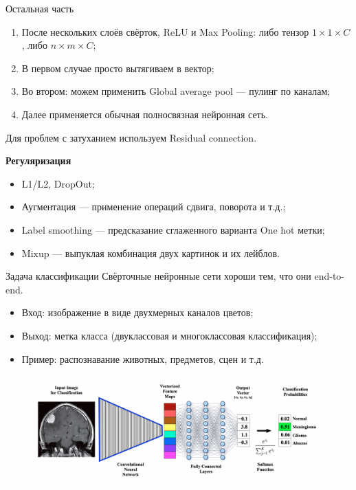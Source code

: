 \documentclass[notheorems, handout]{beamer}
\begin{document}
\begin{frame}{Остальная часть}
    \begin{enumerate}
        \item После нескольких слоёв свёрток, ReLU и Max Pooling: либо тензор $1 \times 1 \times C$, либо $n \times m \times C$;
        \item В первом случае просто вытягиваем в вектор;
        \item Во втором: можем применить Global average pool --- пулинг по каналам;
        \item Далее применяется обычная полносвязная нейронная сеть.
    \end{enumerate}

    Для проблем с затуханием используем Residual connection.

    \textbf{Регуляризация}
    \begin{itemize}
        \item L1/L2, DropOut;
        \item Аугментация --- применение операций сдвига, поворота и т.д.;
        \item Label smoothing --- предсказание сглаженного варианта One hot метки;
        \item Mixup --- выпуклая комбинация двух картинок и их лейблов.
    \end{itemize}
\end{frame}

\begin{frame}{Задача классификации}
    Свёрточные нейронные сети хороши тем, что они end-to-end.

    \begin{itemize}
        \item Вход: изображение в виде двухмерных каналов цветов;
        \item Выход: метка класса (двуклассовая и многоклассовая классификация);
        \item Пример: распознавание животных, предметов, сцен и т.д.
    \end{itemize}

    \begin{figure}
        \includegraphics[width=\linewidth]{img/conv_classification.png}        
    \end{figure}
\end{frame}
\end{document}
